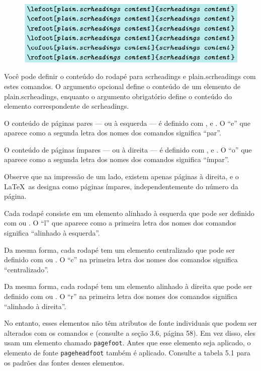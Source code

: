 \begin{figure}
    \centering
    \includegraphics[width=0.8\linewidth]{imagens/imagem26.png}
\end{figure}

Você pode definir o conteúdo do rodapé para scrheadings e plain.scrheadings com estes comandos. O argumento opcional define o conteúdo de um elemento de plain.scrheadings, enquanto o argumento obrigatório define o conteúdo do elemento correspondente de scrheadings.

O conteúdo de páginas pares --- ou à esquerda --- é definido com ,  e . O “e” que aparece como a segunda letra dos nomes dos comandos significa “par”.

O conteúdo de páginas ímpares --- ou à direita --- é definido com ,  e . O “o” que aparece como a segunda letra dos nomes dos comandos significa “ímpar”.

Observe que na impressão de um lado, existem apenas páginas à direita, e o \LaTeX\ as designa como páginas ímpares, independentemente do número da página.

Cada rodapé consiste em um elemento alinhado à esquerda que pode ser definido com  ou . O “l” que aparece como a primeira letra dos nomes dos comandos significa “alinhado à esquerda”.

Da mesma forma, cada rodapé tem um elemento centralizado que pode ser definido com  ou . O “c” na primeira letra dos nomes dos comandos significa “centralizado”.

Da mesma forma, cada rodapé tem um elemento alinhado à direita que pode ser definido com  ou . O “r” na primeira letra dos nomes dos comandos significa “alinhado à direita”.

No entanto, esses elementos não têm atributos de fonte individuais que podem ser alterados com os comandos  e  (consulte a seção 3.6, página 58). Em vez disso, eles usam um elemento chamado \texttt{pa\-ge\-foot}. Antes que esse elemento seja aplicado, o elemento de fonte \texttt{pa\-ge\-head\-foot} também é aplicado. Consulte a tabela 5.1 para os padrões das fontes desses elementos.


